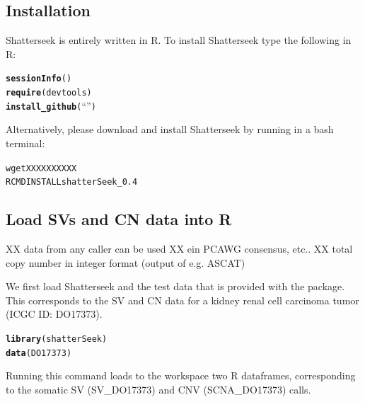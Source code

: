 \documentclass[twoside,a4wide,11pt]{article}\usepackage[]{graphicx}\usepackage[]{color}
\makeatletter
\newcommand{\hlstd}[1]{\textcolor[rgb]{0.345,0.345,0.345}{#1}}%
\newcommand{\hlkwd}[1]{\textcolor[rgb]{0.737,0.353,0.396}{\textbf{#1}}}%
\newenvironment{kframe}{%
 \def\at@end@of@kframe{}%
 \ifinner\ifhmode%
  \def\at@end@of@kframe{\end{minipage}}%
  \begin{minipage}{\columnwidth}%
 \fi\fi%
 \def\FrameCommand##1{\hskip\@totalleftmargin \hskip-\fboxsep
 \colorbox{shadecolor}{##1}\hskip-\fboxsep
     \hskip-\linewidth \hskip-\@totalleftmargin \hskip\columnwidth}%
 \MakeFramed {\advance\hsize-\width
   \@totalleftmargin\z@ \linewidth\hsize
   \@setminipage}}%
 {\par\unskip\endMakeFramed%
 \at@end@of@kframe}
\newenvironment{knitrout}{}{} %
\makeatother
\begin{document}
\subsection{Installation}
Shatterseek is entirely written in R. 
To install Shatterseek type the following in R: 
\begin{knitrout}
\color{fgcolor}\begin{kframe}
\begin{alltt}
\hlkwd{sessionInfo}()
\hlkwd{require}(devtools)
\hlkwd{install_github}(“”)
\end{alltt}
\end{kframe}
\end{knitrout}
Alternatively, please download and install Shatterseek by running in a bash terminal:\\
\begin{knitrout}
\color{fgcolor}\begin{kframe}
\begin{alltt}
wget XXXXXXXXXX
R CMD INSTALL shatterSeek_0.4
\end{alltt}
\end{kframe}
\end{knitrout}

\subsection{Load SVs and CN data into R}

XX data from any caller can be used
XX ein PCAWG consensus, etc.. 
XX total copy number in integer format (output of e.g. ASCAT)

We first load Shatterseek and the test data that is provided with the package.
This corresponds to the SV and CN data for a kidney renal cell carcinoma tumor (ICGC ID: DO17373).
\begin{knitrout}
\color{fgcolor}\begin{kframe}
\begin{alltt}
\hlkwd{library}\hlstd{(shatterSeek)}
\hlkwd{data}\hlstd{(DO17373)}
\end{alltt}
\end{kframe}
\end{knitrout}
Running this command loads to the workspace two R dataframes, corresponding to the somatic SV  (SV\_DO17373)
and CNV (SCNA\_DO17373) calls.
\end{document}
